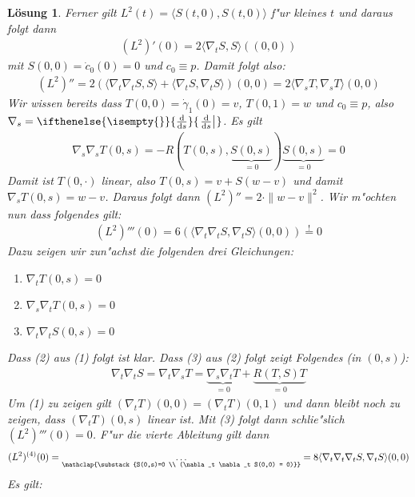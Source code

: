 \documentclass[paper=A4, twoside, chapterprefix=true, bibliography=totoc, headsepline]{scrbook}
\newcommand{\dop}{\mathrm{d}}
\newcommand{\difffrac}[3][]{\ifthenelse{\isempty{#1}}{\frac{\dop #2}{\dop #3}}{\left. \frac{\dop #2}{\dop #3} \right|_{#1}}}
\theoremstyle{plain}
\theoremstyle{nonumberplain}
\theoremstyle{empty}
\theoremstyle{break}
\newtheorem{Loes}{L\"osung}
\begin{document}
\begin{Loes}
Ferner gilt $L^2(t) = \langle S(t,0), S(t,0) \rangle$ f"ur kleines $t$ und daraus folgt dann
\begin{align*}
	(L^2)'(0) = 2 \langle \nabla_t S, S \rangle ((0,0))
\end{align*}
mit $S(0,0) = \dot c_0(0) = 0$ und $c_0 \equiv p$. Damit folgt also:
\begin{align*}
	(L^2)'' = 2 ( \langle \nabla_t \nabla_t S, S \rangle + \langle \nabla_t S, \nabla_t S \rangle ) (0,0) = 2 \langle \nabla_s T, \nabla_s T \rangle (0,0)
\end{align*}
Wir wissen bereits dass $T(0,0) = \dot\gamma_1(0) = v$, $T(0,1) = w$ und $c_0 \equiv p$, also $\nabla_s = \difffrac{}{s}$. Es gilt
\begin{align*}
	\nabla_s \nabla_s T(0,s) = -R ( T(0,s), \underbrace{S(0, s)}_{=0} ) \underbrace{S(0,s)}_{=0} = 0
\end{align*}
Damit ist $T(0,\cdot)$ linear, also $T(0,s) = v + S(w - v)$ und damit $\nabla_s T(0,s) = w - v$.
Daraus folgt dann $(L^2)'' = 2 \cdot \|w - v\|^2$.
Wir m"ochten nun dass folgendes gilt:
\begin{align*}
	(L^2)'''(0) = 6 ( \langle \nabla_t \nabla_t S, \nabla_t S \rangle (0,0) ) \overset{!}{=} 0
\end{align*}
Dazu zeigen wir zun"achst die folgenden drei Gleichungen:\begin{enumerate}[label=(\arabic*)]
	\item $\nabla_t T(0,s) = 0$
	\item $\nabla_s \nabla_t T(0,s) = 0$
	\item $\nabla_t \nabla_t S(0,s) = 0$
\end{enumerate}
Dass (2) aus (1) folgt ist klar. Dass (3) aus (2) folgt zeigt Folgendes (in $(0,s)$):
\begin{align*}
	\nabla_t \nabla_t S = \nabla_t \nabla_s T = \underbrace{\nabla_s \nabla_t T}_{=0} + \underbrace{R(T,S)T}_{=0}
\end{align*}
Um (1) zu zeigen gilt $(\nabla_t T)(0,0) = (\nabla_t T)(0,1)$ und dann bleibt noch zu zeigen, dass $(\nabla_t T)(0,s)$ linear ist.
Mit (3) folgt dann schlie"slich $(L^2)'''(0) = 0$.
F"ur die vierte Ableitung gilt dann
\begin{align*}
	(L^2)^{(4)}(0) = \underset{\mathclap{\substack{S(0,s)=0 \\ (\nabla_t \nabla_t S(0,0) = 0)}}}{\ldots} = 8 \langle \nabla_t\nabla_t\nabla_t S, \nabla_t S \rangle (0,0)
\end{align*}
Es gilt:
\begin{align*}

\end{align*}
\end{Loes}
\end{document}
